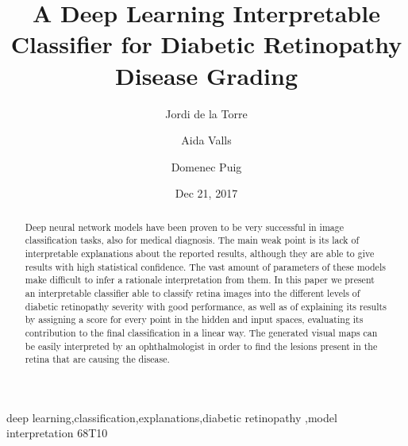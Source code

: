 \documentclass[review]{elsarticle}
\theoremstyle{definition} %
\theoremstyle{remark}
\begin{document}
\begin{frontmatter}

\title{A Deep Learning Interpretable Classifier for Diabetic Retinopathy Disease Grading}

\author[rvt]{Jordi de la Torre}
\author[rvt]{Aida Valls}
\author[rvt]{Domenec Puig}


\address[rvt]{Departament d'Enginyeria Inform\`atica i Matem\`atiques.\\Escola T\`ecnica Superior d'Enginyeria.\\Universitat Rovira i Virgili\\Avinguda Paisos Catalans, 26. E-43007\\
Tarragona, Spain}

\date{Dec 21, 2017}

\begin{abstract}
Deep neural network models have been proven to be very successful in image classification tasks, also for medical diagnosis. The main weak point is its lack of interpretable explanations about the reported results, although they are able to give results with high statistical confidence. The vast amount of parameters of these models make difficult to infer a rationale interpretation from them. In this paper we present an interpretable classifier able to classify retina images into the different levels of diabetic retinopathy severity with good performance, as well as of explaining its results by assigning a score for every point in the hidden and input spaces, evaluating its contribution to the final classification in a linear way. The generated visual maps can be easily interpreted by an ophthalmologist in order to find the lesions present in the retina that are causing the disease.
\end{abstract}

\begin{keyword}
deep learning\sep classification\sep explanations\sep diabetic retinopathy \sep model interpretation
\MSC[2010] 68T10
\end{keyword}

\end{frontmatter}

\end{document}
